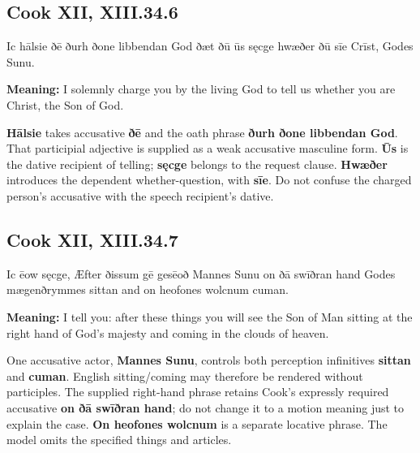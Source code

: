 \par\begin{minipage}{\linewidth}\raggedright
\subsection*{Cook XII, XIII.34.6}

Ic hālsie ðē ðurh ðone libbendan God ðæt ðū ūs sęcge hwæðer ðū sīe Crīst, Godes Sunu.

\textbf{Meaning:} I solemnly charge you by the living God to tell us whether you are Christ, the Son of God.

\textbf{Hālsie} takes accusative \textbf{ðē} and the oath phrase \textbf{ðurh ðone libbendan God}. That participial adjective is supplied as a weak accusative masculine form. \textbf{Ūs} is the dative recipient of telling; \textbf{sęcge} belongs to the request clause. \textbf{Hwæðer} introduces the dependent whether-question, with \textbf{sīe}. Do not confuse the charged person’s accusative with the speech recipient’s dative.

\end{minipage}\par\addvspace{4pt}

\par\begin{minipage}{\linewidth}\raggedright
\subsection*{Cook XII, XIII.34.7}

Ic ēow sęcge, Æfter ðissum gē gesēoð Mannes Sunu on ðā swīðran hand Godes mægenðrymmes sittan and on heofones wolcnum cuman.

\textbf{Meaning:} I tell you: after these things you will see the Son of Man sitting at the right hand of God’s majesty and coming in the clouds of heaven.

One accusative actor, \textbf{Mannes Sunu}, controls both perception infinitives \textbf{sittan} and \textbf{cuman}. English sitting/\allowbreak{}coming may therefore be rendered without participles. The supplied right-hand phrase retains Cook’s expressly required accusative \textbf{on ðā swīðran hand}; do not change it to a motion meaning just to explain the case. \textbf{On heofones wolcnum} is a separate locative phrase. The model omits the specified things and articles.

\end{minipage}\par\addvspace{4pt}

